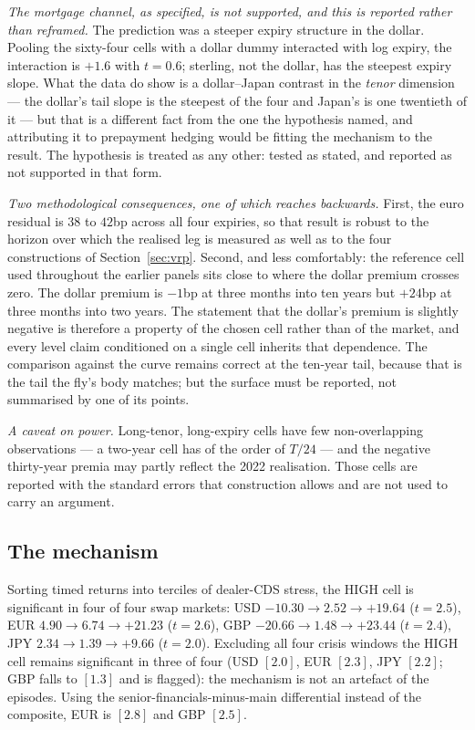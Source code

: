 \documentclass[11pt]{article}
\begin{document}
\emph{The mortgage channel, as specified, is not supported, and this is reported rather than reframed.}
The prediction was a steeper expiry structure in the dollar. Pooling the sixty-four cells with a dollar
dummy interacted with log expiry, the interaction is $+1.6$ with $t=0.6$; sterling, not the dollar, has
the steepest expiry slope. What the data do show is a dollar--Japan contrast in the \emph{tenor}
dimension --- the dollar's tail slope is the steepest of the four and Japan's is one twentieth of it ---
but that is a different fact from the one the hypothesis named, and attributing it to prepayment hedging
would be fitting the mechanism to the result. The hypothesis is treated as any other: tested as stated,
and reported as not supported in that form.

\emph{Two methodological consequences, one of which reaches backwards.} First, the euro residual is
$38$ to $42$bp across all four expiries, so that result is robust to the horizon over which the realised
leg is measured as well as to the four constructions of Section~\ref{sec:vrp}. Second, and less
comfortably: the reference cell used throughout the earlier panels sits close to where the dollar premium
crosses zero. The dollar premium is $-1$bp at three months into ten years but $+24$bp at three months
into two years. The statement that the dollar's premium is slightly negative is therefore a property of
the chosen cell rather than of the market, and every level claim conditioned on a single cell inherits
that dependence. The comparison against the curve remains correct at the ten-year tail, because that is
the tail the fly's body matches; but the surface must be reported, not summarised by one of its points.

\emph{A caveat on power.} Long-tenor, long-expiry cells have few non-overlapping observations --- a
two-year cell has of the order of $T/24$ --- and the negative thirty-year premia may partly reflect the
2022 realisation. Those cells are reported with the standard errors that construction allows and are not
used to carry an argument.

\subsection{The mechanism}\label{sec:mechanism}
Sorting timed returns into terciles of dealer-CDS stress, the HIGH cell is significant in four of four
swap markets: USD $-10.30 \to 2.52 \to +19.64$ ($t=2.5$), EUR $4.90 \to 6.74 \to +21.23$ ($t=2.6$),
GBP $-20.66 \to 1.48 \to +23.44$ ($t=2.4$), JPY $2.34 \to 1.39 \to +9.66$ ($t=2.0$). Excluding all four
crisis windows the HIGH cell remains significant in three of four (USD $[2.0]$, EUR $[2.3]$,
JPY $[2.2]$; GBP falls to $[1.3]$ and is flagged): the mechanism is not an artefact of the episodes.
Using the senior-financials-minus-main differential instead of the composite, EUR is $[2.8]$ and GBP
$[2.5]$.
\end{document}
